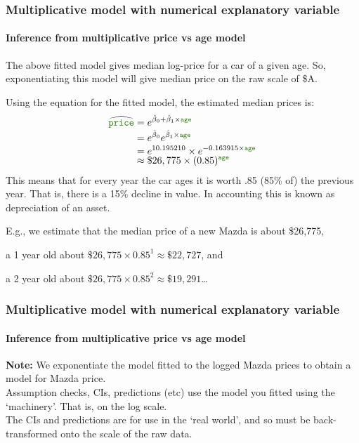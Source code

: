 \documentclass{beamer}\usepackage[]{graphicx}\usepackage[]{xcolor}
\begin{document}
\begin{frame}[fragile]
\frametitle{Multiplicative model with numerical explanatory variable}
\framesubtitle{Inference from multiplicative price vs age model}
The above fitted model gives median log-price for a car of a given age.
So, exponentiating this model will give median price on the raw scale of \$A.

Using the equation for the fitted model, the estimated median prices is:
\begin{align*}
     \widehat{\rcode{price}}&=e^{\hat{\beta}_0+\hat{\beta}_1\times\rcode{age}} \\[-1mm]
                  &=e^{\hat{\beta}_0}e^{\hat{\beta}_1\times\rcode{age}}\\[-1mm]
                  &=e^{10.195210}\times e^{-0.163915 \times\rcode{age}} \\[-2mm]
                  &\approx \$26,775\times(0.85)^{\rcode{age}}
\end{align*}
This means that for every year the car ages it is worth .85 (85\% of) the previous year. That is, there is a 15\% decline in value. 
In accounting this is known as depreciation of an asset.

E.g., we estimate that the median price of a new Mazda is about \$26,775, 

a 1 year old about  $\$26,775\times 0.85^1\approx \$22,727$, and 

a 2 year old about  $\$26,775\times 0.85^2\approx \$19,291$\ldots
\end{frame}


\begin{frame}[fragile]
\frametitle{Multiplicative model with numerical explanatory variable}
\framesubtitle{Inference from multiplicative price vs age model}
\textbf{Note:} We exponentiate the model fitted to the logged Mazda prices
to obtain a model for Mazda price.\\
\bigskip\bigskip
Assumption checks, CIs, predictions (etc) use the model you fitted using the  `machinery'. That is, on the log scale.\\
\bigskip\bigskip
The CIs and predictions are for use in the `real world', and
so must be back-transformed onto the scale of the raw data.
\end{frame}
\end{document}
